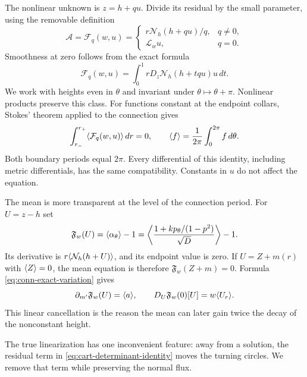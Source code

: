 The nonlinear unknown is $z=h+qu$. Divide its residual by the small
parameter, using the removable definition
\begin{equation}\label{eq:cart-removable-equation}
 \mathcal A=\mathcal F_q(w,u)=
 \begin{cases}r\mathcal N_h(h+qu)/q,&q\ne0,\\
 \mathscr L_wu,&q=0.
 \end{cases}
\end{equation}
Smoothness at zero follows from the exact formula
\begin{equation}\label{eq:normalized-integral}
 \mathcal F_q(w,u)=\int_0^1 rD_z\mathcal N_h(h+tqu)u\,dt.
\end{equation}
We work with heights even in $\theta$ and invariant under
$\theta\mapsto\theta+\pi$. Nonlinear products preserve this class.
For functions constant at the endpoint collars, Stokes' theorem
applied to the connection gives
\begin{equation}\label{eq:zero-total-integral}
 \int_{r_-}^{r_+}\langle \mathcal F_q(w,u)\rangle\,dr=0,
 \qquad \langle f\rangle=\frac1{2\pi}\int_0^{2\pi}f\,d\theta.
\end{equation}
Both boundary periods equal $2\pi$. Every differential of this
identity, including metric differentials, has the same compatibility.
Constants in $u$ do not affect the equation.
\label{lem:scalar-integral}

The mean is more transparent at the level of the connection period.
For $U=z-h$ set
\begin{equation}\label{eq:cart-mean-path-flux}
 \mathfrak F_w(U)=\langle \alpha_\theta\rangle-1
 =\left\langle\frac{1+kp_\theta/(1-p^2)}{\sqrt D}\right\rangle-1.
\end{equation}
Its derivative is $r\langle \mathcal N_h(h+U)\rangle$, and its endpoint
value is zero. If $U=Z+m(r)$ with $\langle Z\rangle=0$, the mean equation
is therefore $\mathfrak F_w(Z+m)=0$. Formula
\eqref{eq:conn-exact-variation} gives
\begin{equation}\label{eq:mean-period-derivative}
 \partial_{m'}\mathfrak F_w(U)=\langle a\rangle,
 \qquad D_U\mathfrak F_w(0)[U]=w\langle U_r\rangle.
\end{equation}
This linear cancellation is the reason the mean can later gain
twice the decay of the nonconstant height.

The true linearization has one inconvenient feature: away from a
solution, the residual term in
\eqref{eq:cart-determinant-identity} moves the turning circles.
We remove that term while preserving the normal flux.

